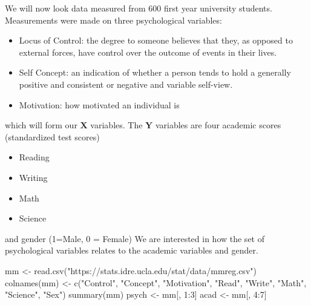 \documentclass[
]{book}
\newenvironment{Shaded}{\begin{snugshade}}{\end{snugshade}}
\newcommand{\DecValTok}[1]{\textcolor[rgb]{0.00,0.00,0.81}{#1}}
\newcommand{\FunctionTok}[1]{\textcolor[rgb]{0.00,0.00,0.00}{#1}}
\newcommand{\NormalTok}[1]{#1}
\newcommand{\OtherTok}[1]{\textcolor[rgb]{0.56,0.35,0.01}{#1}}
\newcommand{\SpecialCharTok}[1]{\textcolor[rgb]{0.00,0.00,0.00}{#1}}
\newcommand{\StringTok}[1]{\textcolor[rgb]{0.31,0.60,0.02}{#1}}
\providecommand{\tightlist}{%
  \setlength{\itemsep}{0pt}\setlength{\parskip}{0pt}}
\theoremstyle{definition}
\theoremstyle{definition}
\theoremstyle{definition}
\theoremstyle{definition}
\theoremstyle{remark}
\begin{document}
We will now look data measured from 600 first year university students. Measurements were made on three psychological variables:

\begin{itemize}
\tightlist
\item
  Locus of Control: the degree to someone believes that they, as opposed to external forces, have control over the outcome of events in their lives.
\item
  Self Concept: an indication of whether a person tends to hold a generally positive and consistent or negative and variable self-view.
\item
  Motivation: how motivated an individual is
\end{itemize}

which will form our \(\mathbf X\) variables. The \(\mathbf Y\) variables are four academic scores (standardized test scores)

\begin{itemize}
\tightlist
\item
  Reading
\item
  Writing
\item
  Math
\item
  Science
\end{itemize}

and gender (1=Male, 0 = Female) We are interested in how the set of psychological variables relates to the academic variables and gender.

\begin{Shaded}
\begin{Highlighting}[]
\NormalTok{mm }\OtherTok{\textless{}{-}} \FunctionTok{read.csv}\NormalTok{(}\StringTok{"https://stats.idre.ucla.edu/stat/data/mmreg.csv"}\NormalTok{)}
\FunctionTok{colnames}\NormalTok{(mm) }\OtherTok{\textless{}{-}} \FunctionTok{c}\NormalTok{(}\StringTok{"Control"}\NormalTok{, }\StringTok{"Concept"}\NormalTok{, }\StringTok{"Motivation"}\NormalTok{,}
                  \StringTok{"Read"}\NormalTok{, }\StringTok{"Write"}\NormalTok{, }\StringTok{"Math"}\NormalTok{,}
    \StringTok{"Science"}\NormalTok{, }\StringTok{"Sex"}\NormalTok{)}
\FunctionTok{summary}\NormalTok{(mm)}
\NormalTok{psych }\OtherTok{\textless{}{-}}\NormalTok{ mm[, }\DecValTok{1}\SpecialCharTok{:}\DecValTok{3}\NormalTok{]}
\NormalTok{acad }\OtherTok{\textless{}{-}}\NormalTok{ mm[, }\DecValTok{4}\SpecialCharTok{:}\DecValTok{7}\NormalTok{]}
\end{Highlighting}
\end{Shaded}
\end{document}
